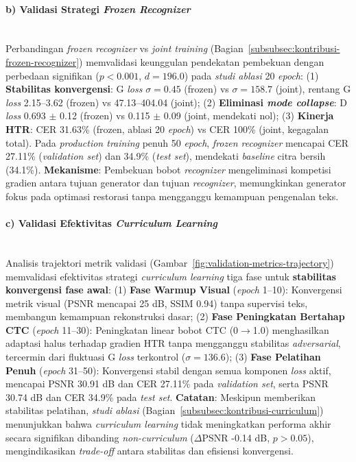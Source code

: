 \documentclass[12pt,a4paper]{article}
\begin{document}
\paragraph{b) Validasi Strategi \textit{Frozen Recognizer}}\mbox{}\\[0.1em]

Perbandingan \textit{frozen recognizer} vs \textit{joint training} (Bagian~\ref{subsubsec:kontribusi-frozen-recognizer}) memvalidasi keunggulan pendekatan pembekuan dengan perbedaan signifikan ($p<0.001$, $d=196.0$) pada \textit{studi ablasi} 20 \textit{epoch}: (1) \textbf{Stabilitas konvergensi}: G \textit{loss} $\sigma = 0.45$ (frozen) vs $\sigma = 158.7$ (joint), rentang G \textit{loss} 2.15--3.62 (frozen) vs 47.13--404.04 (joint); (2) \textbf{Eliminasi \textit{mode collapse}}: D \textit{loss} 0.693 $\pm$ 0.12 (frozen) vs 0.115 $\pm$ 0.09 (joint, mendekati nol); (3) \textbf{Kinerja HTR}: CER 31.63\% (frozen, ablasi 20 \textit{epoch}) vs CER 100\% (joint, kegagalan total). Pada \textit{production training} penuh 50 \textit{epoch}, \textit{frozen recognizer} mencapai CER 27.11\% (\textit{validation set}) dan 34.9\% (\textit{test set}), mendekati \textit{baseline} citra bersih (34.1\%). \textbf{Mekanisme}: Pembekuan bobot \textit{recognizer} mengeliminasi kompetisi gradien antara tujuan generator dan tujuan \textit{recognizer}, memungkinkan generator fokus pada optimasi restorasi tanpa mengganggu kemampuan pengenalan teks.

\paragraph{c) Validasi Efektivitas \textit{Curriculum Learning}}\mbox{}\\[0.1em]

Analisis trajektori metrik validasi (Gambar~\ref{fig:validation-metrics-trajectory}) memvalidasi efektivitas strategi \textit{curriculum learning} tiga fase untuk \textbf{stabilitas konvergensi fase awal}: (1) \textbf{Fase Warmup Visual} (\textit{epoch} 1--10): Konvergensi metrik visual (PSNR mencapai 25 dB, SSIM 0.94) tanpa supervisi teks, membangun kemampuan rekonstruksi dasar; (2) \textbf{Fase Peningkatan Bertahap CTC} (\textit{epoch} 11--30): Peningkatan linear bobot CTC (0$\rightarrow$1.0) menghasilkan adaptasi halus terhadap gradien HTR tanpa mengganggu stabilitas \textit{adversarial}, tercermin dari fluktuasi G \textit{loss} terkontrol ($\sigma = 136.6$); (3) \textbf{Fase Pelatihan Penuh} (\textit{epoch} 31--50): Konvergensi stabil dengan semua komponen \textit{loss} aktif, mencapai PSNR 30.91 dB dan CER 27.11\% pada \textit{validation set}, serta PSNR 30.74 dB dan CER 34.9\% pada \textit{test set}. \textbf{Catatan}: Meskipun memberikan stabilitas pelatihan, \textit{studi ablasi} (Bagian~\ref{subsubsec:kontribusi-curriculum}) menunjukkan bahwa \textit{curriculum learning} tidak meningkatkan performa akhir secara signifikan dibanding \textit{non-curriculum} ($\Delta$PSNR -0.14 dB, $p>0.05$), mengindikasikan \textit{trade-off} antara stabilitas dan efisiensi konvergensi.
\end{document}

